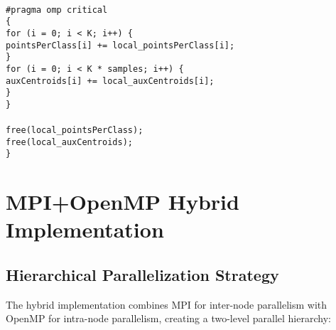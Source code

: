 \documentclass[12pt,a4paper]{article}
\begin{document}
\begin{algorithm}[H]
\begin{flushleft}
\\
\hspace{1cm}\texttt{\#pragma omp critical}\\
\hspace{1cm}\texttt{\{}\\
\hspace{2cm}\texttt{for (i = 0; i < K; i++) \{}\\
\hspace{3cm}\texttt{pointsPerClass[i] += local\_pointsPerClass[i];}\\
\hspace{2cm}\texttt{\}}\\
\hspace{2cm}\texttt{for (i = 0; i < K * samples; i++) \{}\\
\hspace{3cm}\texttt{auxCentroids[i] += local\_auxCentroids[i];}\\
\hspace{2cm}\texttt{\}}\\
\hspace{1cm}\texttt{\}}\\
\\
\hspace{1cm}\texttt{free(local\_pointsPerClass);}\\
\hspace{1cm}\texttt{free(local\_auxCentroids);}\\
\texttt{\}}
\end{flushleft}
\end{algorithm}

\section{MPI+OpenMP Hybrid Implementation}

\subsection{Hierarchical Parallelization Strategy}

The hybrid implementation combines MPI for inter-node parallelism with OpenMP for intra-node parallelism, creating a two-level parallel hierarchy:
\end{document}
